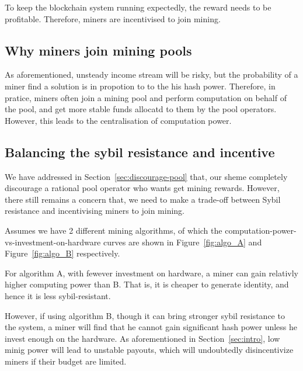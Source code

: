 To keep the blockchain system running expectedly, the reward needs to be profitable.
Therefore, miners are incentivised to join mining.

\subsection{Why miners join mining pools}



As aforementioned, unsteady income stream will be risky, but the probability of a miner find a solution is in propotion to to the his hash power.
Therefore, in pratice, miners often join a mining pool and perform computation on behalf of the pool, and get more stable funds allocatd to them by the pool operators.
However, this leads to the centralisation of computation power.

\subsection{Balancing the sybil resistance and incentive}

We have addressed in Section~\ref{sec:discourage-pool} that, our sheme completely discourage a rational pool operator who wants get mining rewards.
However, there still remains a concern that, we need to make a trade-off between Sybil resistance and incentivising miners to join mining.


Assumes we have 2 different mining algorithms, of which the computation-power-vs-investment-on-hardware curves are shown in Figure~\ref{fig:algo_A} and Figure~\ref{fig:algo_B} respectively.

For algorithm A, with fewever investment on hardware, a miner can gain relativly higher computing power than B. That is, it is cheaper to generate identity, and hence it is less sybil-resistant.

However, if using algorithm B, though it can bring stronger sybil resistance to the system, a miner will find that he cannot gain significant hash power unless he invest enough on the hardware.
As aforementioned in Section~\ref{sec:intro}, low minig power will lead to unstable payouts, which will undoubtedly disincentivize miners if their budget are limited.

